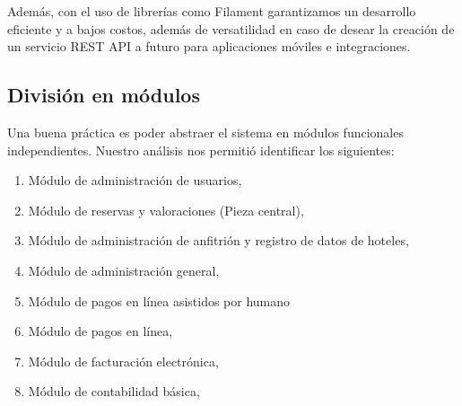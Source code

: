 Además, con el uso de librerías como Filament garantizamos un desarrollo eficiente y a bajos costos, además de versatilidad en caso de desear la creación de un servicio REST API a futuro para aplicaciones móviles e integraciones.

\subsection{División en módulos}

Una buena práctica es poder abstraer el sistema en módulos funcionales independientes. Nuestro análisis nos permitió identificar los siguientes:

\begin{enumerate}
\item Módulo de administración de usuarios,
\item Módulo de reservas y valoraciones (Pieza central),
\item Módulo de administración de anfitrión y registro de datos de hoteles,
\item Módulo de administración general,
\item Módulo de pagos en línea asistidos por humano
\item Módulo de pagos en línea,
\item Módulo de facturación electrónica,
\item Módulo de contabilidad básica,
\end{enumerate}